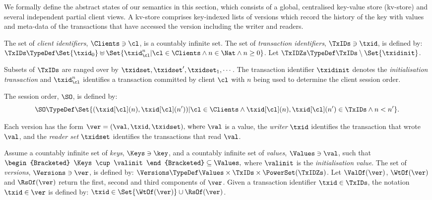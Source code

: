 We formally define the abstract states of our semantics in this section,
which consists of a global, centralised key-value store (kv-store) and several independent partial client views.
A kv-store comprises key-indexed lists of versions which record
the history of the key with values and meta-data of the
transactions that have accessed the version including the writer and readers.

\begin{definition}
    \label{def:client-id}
    \label{def:transaction-id}
    The set of \emph{client identifiers}, \( \Clients \ni \cl \), is a countably infinite set.
    The set of \emph{transaction identifiers}, \(\TxIDs \ni \txid\), is defined by:
    \( \TxIDs \TypeDef \Set{\txid_{0}} 
    \uplus \Set{ \txid_{\cl}^{n} | \cl \in \Clients \land n \in \Nat \land n \geq 0 } \).
    Let \(\TxIDZs \TypeDef \TxIDs \setminus \Set{\txidinit}\).
\end{definition}

Subsets of \(\TxIDs\)  are ranged over by \(\txidset, \txidset', \txidset_1, \cdots\). 
The transaction identifier \(\txidinit\) denotes the \emph{initialisation transaction}
and \(\txid_{\cl}^{n}\) identifies a transaction committed by client
\(\cl\) with \(n\) being used to determine the client session order.

\begin{definition}
\label{def:session-order}
The session order, \( \SO \), is defined by:
\[
    \SO \TypeDef \Set{ (\txid[\cl](n), \txid[\cl](n')) | \cl \in \Clients 
        \land \txid[\cl](n), \txid[\cl](n') \in \TxIDs \land n < n'}. 
\]
\end{definition}

Each version has the form \(\ver = (\val, \txid, \txidset)$,
where \(\val\) is a value, 
the \emph{writer} \(\txid\) identifies the transaction that wrote \(\val\), 
and the \emph{reader set} \(\txidset\) identifies the transactions that read \(\val\). 

\begin{definition}
    \label{def:keys}
    \label{def:values}
    \label{def:versions}
    Assume a countably infinite set of \emph{keys}, \(\Keys \ni \key\), 
    and a countably infinite set of \emph{values}, \(\Values \ni \val\),
    such that 
    \( \begin{Bracketed} \Keys \cup \valinit \end{Bracketed} \subseteq \Values, \)
    where \(\valinit\) is the \emph{initialisation value}.
    The set of \emph{versions}, \(\Versions \ni \ver\), is defined by:
    \(\Versions \TypeDef \Values \times \TxIDs \times \PowerSet(\TxIDZs)\). 
    Let \(\ValOf(\ver)\), \(\WtOf(\ver)\) and \(\RsOf(\ver)\) 
    return the first, second and third components of \(\ver\).
    Given a transaction identifier \( \txid \in \TxIDs \), 
    the notation \( \txid \in \ver \) is defined by: \( \txid \in \Set{\WtOf(\ver)} \cup \RsOf(\ver)\).
\end{definition}

